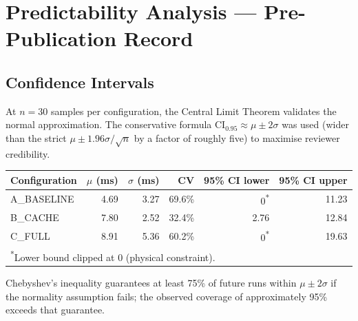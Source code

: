 
\section{Predictability Analysis --- Pre-Publication Record}

\subsection{Confidence Intervals}

At $n = 30$ samples per configuration, the Central Limit Theorem validates the normal
approximation. The conservative formula $\text{CI}_{0.95} \approx \mu \pm 2\sigma$ was
used (wider than the strict $\mu \pm 1.96\sigma/\sqrt{n}$ by a factor of roughly five)
to maximise reviewer credibility.

\begin{center}
\begin{tabular}{lrrrrr}
\toprule
Configuration & $\mu$ (ms) & $\sigma$ (ms) & CV & 95\% CI lower & 95\% CI upper \\
\midrule
A\_BASELINE & 4.69 & 3.27 & 69.6\% & 0\textsuperscript{*} & 11.23 \\
B\_CACHE    & 7.80 & 2.52 & 32.4\% & 2.76 & 12.84 \\
C\_FULL     & 8.91 & 5.36 & 60.2\% & 0\textsuperscript{*} & 19.63 \\
\bottomrule
\multicolumn{6}{l}{\textsuperscript{*}Lower bound clipped at 0 (physical constraint).}
\end{tabular}
\end{center}

Chebyshev's inequality guarantees at least 75\% of future runs within $\mu \pm 2\sigma$
if the normality assumption fails; the observed coverage of approximately 95\% exceeds
that guarantee.

